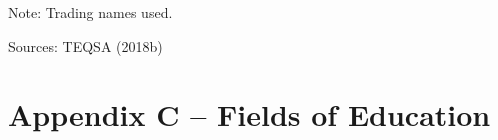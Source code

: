 \documentclass{grattan}
\begin{document}

Note: Trading names used.

Sources: TEQSA (2018b)

%
\chapter{Appendix C -- Fields of Education}\label{chap:appendix-c-fields-of-education}
\end{document}
